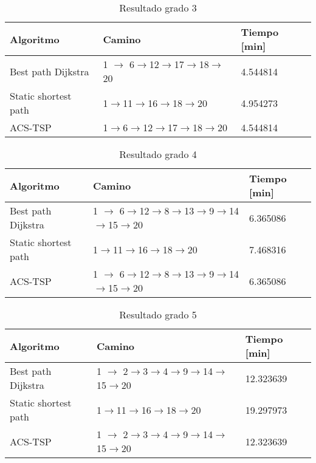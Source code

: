 \begin{table}[H]
\centering
\begin{tabular}{|l|l|l|}
\hline
Algoritmo            & Camino           & Tiempo {[}min{]} \\ \hline
Best path Dijkstra   & 1 $\rightarrow$ 6$\rightarrow$12$\rightarrow$17$\rightarrow$18$\rightarrow$20 & 4.544814         \\ \hline
Static shortest path & 1$\rightarrow$11$\rightarrow$16$\rightarrow$18$\rightarrow$20    & 4.954273         \\ \hline
ACS-TSP              & 1$\rightarrow$6$\rightarrow$12$\rightarrow$17$\rightarrow$18$\rightarrow$20 & 4.544814         \\ \hline
\end{tabular}
\caption{Resultado grado 3}
\label{res-grade-3}
\end{table}


\begin{table}[H]
\centering
\begin{tabular}{|l|l|l|}
\hline
Algoritmo            & Camino           & Tiempo {[}min{]} \\ \hline
Best path Dijkstra   & 1 $\rightarrow$ 6$\rightarrow$12$\rightarrow$8$\rightarrow$13$\rightarrow$9$\rightarrow$14$\rightarrow$15$\rightarrow$20& 6.365086         \\ \hline
Static shortest path & 1$\rightarrow$11$\rightarrow$16$\rightarrow$18$\rightarrow$20    & 7.468316         \\ \hline
ACS-TSP              & 1 $\rightarrow$ 6$\rightarrow$12$\rightarrow$8$\rightarrow$13$\rightarrow$9$\rightarrow$14$\rightarrow$15$\rightarrow$20& 6.365086        \\ \hline
\end{tabular}
\caption{Resultado grado 4}
\label{res-grade-4}
\end{table}


\begin{table}[H]
\centering
\begin{tabular}{|l|l|l|}
\hline
Algoritmo            & Camino           & Tiempo {[}min{]} \\ \hline
Best path Dijkstra   & 1 $\rightarrow$ 2$\rightarrow$3$\rightarrow$4$\rightarrow$9$\rightarrow$14$\rightarrow$15$\rightarrow$20 & 12.323639         \\ \hline
Static shortest path & 1$\rightarrow$11$\rightarrow$16$\rightarrow$18$\rightarrow$20    & 19.297973         \\ \hline
ACS-TSP              & 1 $\rightarrow$ 2$\rightarrow$3$\rightarrow$4$\rightarrow$9$\rightarrow$14$\rightarrow$15$\rightarrow$20 & 12.323639         \\ \hline
\end{tabular}
\caption{Resultado grado 5}
\label{res-grade-5}
\end{table}
